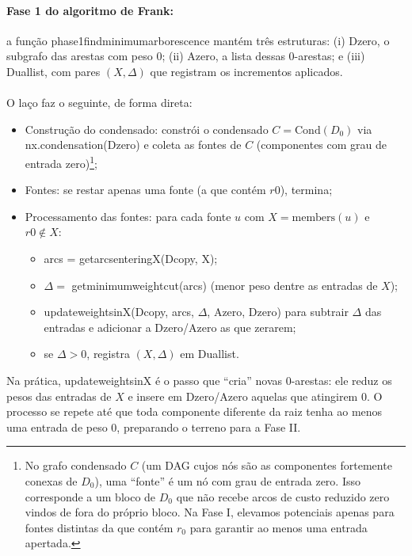 \documentclass[12pt,a4paper]{article}
\def\texttt#1{#1}%
\def\emph#1{#1}%
\def\_{}%
\begin{document}
\paragraph{Fase 1 do algoritmo de Frank:}
a função \texttt{phase1\_find\_minimum\_arborescence} mantém três estruturas: (i) \texttt{D\_zero}, o subgrafo das arestas com peso 0; (ii) \texttt{A\_zero}, a lista dessas 0-arestas; e (iii) \texttt{Dual\_list}, com pares \((X,\Delta)\) que registram os incrementos aplicados.

\paragraph{}
O laço faz o seguinte, de forma direta:
\begin{itemize}
    \item \emph{Construção do condensado:} constrói o condensado \(C=\mathrm{Cond}(D_0)\) via \texttt{nx.condensation(D\_zero)} e coleta as \emph{fontes} de \(C\) (componentes com grau de entrada zero)\footnote{No grafo condensado \(C\) (um DAG cujos nós são as componentes fortemente conexas de \(D_0\)), uma ``fonte'' é um nó com grau de entrada zero. Isso corresponde a um bloco de \(D_0\) que não recebe arcos de custo reduzido zero vindos de fora do próprio bloco. Na Fase I, elevamos potenciais apenas para fontes distintas da que contém \(r_0\) para garantir ao menos uma entrada apertada.};
    \item \emph{Fontes:} se restar apenas uma fonte (a que contém \(r0\)), termina;
    \item \emph{Processamento das fontes:} para cada fonte \(u\) com \(X=\text{members}(u)\) e \(r0\notin X\):
          \begin{itemize}
              \item \texttt{arcs = get\_arcs\_entering\_X(D\_copy, X)};
              \item \(\Delta =\) \texttt{get\_minimum\_weight\_cut(arcs)} (menor peso dentre as entradas de \(X\));
              \item \texttt{update\_weights\_in\_X(D\_copy, arcs, \(\Delta\), A\_zero, D\_zero)} para subtrair \(\Delta\) das entradas e adicionar a \texttt{D\_zero}/\texttt{A\_zero} as que zerarem;
              \item se \(\Delta>0\), registra \((X,\Delta)\) em \texttt{Dual\_list}.
          \end{itemize}
\end{itemize}

Na prática, \texttt{update\_weights\_in\_X} é o passo que “cria” novas 0-arestas: ele reduz os pesos das entradas de \(X\) e insere em \texttt{D\_zero}/\texttt{A\_zero} aquelas que atingirem 0. O processo se repete até que toda componente diferente da raiz tenha ao menos uma entrada de peso 0, preparando o terreno para a Fase II.
\end{document}
